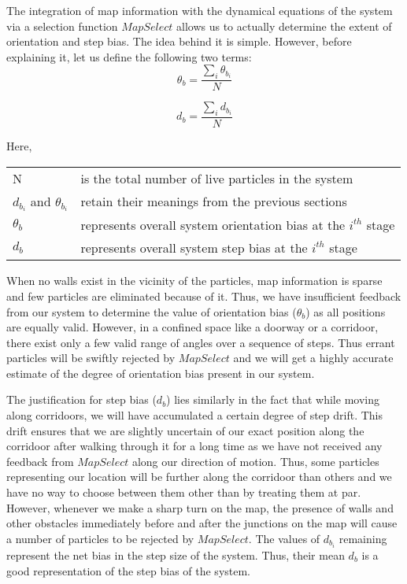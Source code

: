 The integration of map information with the dynamical equations of the system 
via a selection function $MapSelect$ allows us to actually determine 
the extent of orientation and step bias. The idea behind it is simple. 
However, before explaining it, let us define the following two terms:
\begin{equation}
\theta_b = \frac{\sum_{i} \theta_{b_i}}{N}
\end{equation}

\begin{equation}
d_b = \frac{\sum_{i} d_{b_i}}{N}
\end{equation}

Here,\\
\begin{tabular}{p{1.5in} p{3.5in}}
N & is the total number of live particles in the system \\
$d_{b_i}$ and $\theta_{b_i}$ & retain their meanings from the previous sections \\
$\theta_b$ & represents overall system orientation bias at the $i^{th}$ stage \\
$d_b$ & represents overall system step bias at the $i^{th}$ stage \\
\end{tabular}

When no walls exist in the vicinity of the particles, map information is sparse
and few particles are eliminated because of it. Thus, we have insufficient 
feedback from our system to determine the value of orientation bias ($\theta_b$)
as all positions are equally valid. However, in a confined space like a 
doorway or a corridoor, there exist only a few valid range of angles over 
a sequence of steps. Thus
errant particles will be swiftly rejected by $MapSelect$ and we will 
get a highly accurate estimate of the degree of orientation bias present 
in our system.

The justification for step bias ($d_b$) lies similarly in the fact that while
moving along corridoors, we will have accumulated
a certain degree of step drift. This drift ensures that we are slightly 
uncertain of our exact position along the corridoor after walking through it for a long time
as we have not received any feedback from $MapSelect$ along our direction of motion. 
Thus,
some particles representing our location will be further along the corridoor than others and we have no way 
to choose between them other than by treating them at par. However, 
whenever we make a sharp turn on the map, the presence of walls and other 
obstacles immediately before and after the junctions on the map will cause 
a number of particles to be rejected by $MapSelect$. The values of $d_{b_i}$
remaining represent the net bias in the step size of the system. Thus,
their mean $d_b$ is a good representation of the step bias of the system.

